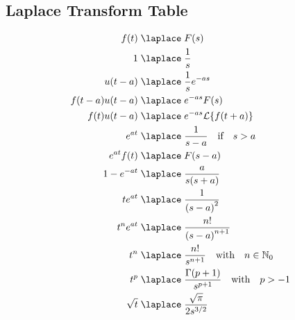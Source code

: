 \subsection{Laplace Transform Table}
\noindent
\begin{align*}
    f(t)                            \;                      & \laplace\; F(s)                                                               \\
    1                               \;                      & \laplace\; \frac{1}{s}                                                        \\
    u(t-a)                          \;                      & \laplace\; \frac{1}{s}e^{-as}                                                 \\
    f(t-a)u(t-a)                    \;                      & \laplace\; e^{-as}F(s)                                                        \\
    f(t)u(t-a)                      \;                      & \laplace\; e^{-as}\mathcal{L}\{f(t+a)\}                                       \\
    e^{at}                          \;                      & \laplace\; \frac{1}{s-a} \quad \text{if} \quad s>a \;                         \\
    e^{at}f(t)                      \;                      & \laplace\; F(s-a)                                                             \\
    1-e^{-at}                       \;                      & \laplace\; \frac{a}{s(s+a)}                                                   \\
    te^{at}                         \;                      & \laplace\; \frac{1}{{(s-a)}^2}                                                \\
    t^{n}e^{at}                     \;                      & \laplace\; \frac{n!}{{(s-a)}^{n+1}}                                           \\
    t^{n}                           \;                      & \laplace\; \frac{n!}{s^{n+1}} \quad \text{with} \quad n \in \mathbb{N}_0      \\
    t^{p}                           \;                      & \laplace\; \frac{\Gamma(p+1)}{s^{p+1}} \quad \text{with} \quad p > -1         \\
    \sqrt{t}                        \;                      & \laplace\; \frac{\sqrt{\pi}}{2{s}^{3/2}}                                      \\

\end{align*}
